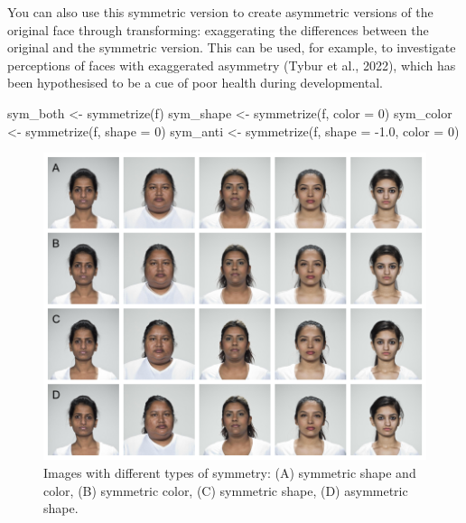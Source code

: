 \documentclass[
  doc,floatsintext]{apa6}
\newenvironment{Shaded}{\begin{snugshade}}{\end{snugshade}}
\newcommand{\AttributeTok}[1]{\textcolor[rgb]{0.77,0.63,0.00}{#1}}
\newcommand{\DecValTok}[1]{\textcolor[rgb]{0.00,0.00,0.81}{#1}}
\newcommand{\FloatTok}[1]{\textcolor[rgb]{0.00,0.00,0.81}{#1}}
\newcommand{\FunctionTok}[1]{\textcolor[rgb]{0.00,0.00,0.00}{#1}}
\newcommand{\NormalTok}[1]{#1}
\newcommand{\OtherTok}[1]{\textcolor[rgb]{0.56,0.35,0.01}{#1}}
\newcommand{\SpecialCharTok}[1]{\textcolor[rgb]{0.00,0.00,0.00}{#1}}
\begin{document}
You can also use this symmetric version to create asymmetric versions of the original face through transforming: exaggerating the differences between the original and the symmetric version. This can be used, for example, to investigate perceptions of faces with exaggerated asymmetry (Tybur et al., 2022), which has been hypothesised to be a cue of poor health during developmental.

\begin{Shaded}
\begin{Highlighting}[]
\NormalTok{sym\_both }\OtherTok{\textless{}{-}} \FunctionTok{symmetrize}\NormalTok{(f)}
\NormalTok{sym\_shape }\OtherTok{\textless{}{-}} \FunctionTok{symmetrize}\NormalTok{(f, }\AttributeTok{color =} \DecValTok{0}\NormalTok{)}
\NormalTok{sym\_color }\OtherTok{\textless{}{-}} \FunctionTok{symmetrize}\NormalTok{(f, }\AttributeTok{shape =} \DecValTok{0}\NormalTok{)}
\NormalTok{sym\_anti }\OtherTok{\textless{}{-}} \FunctionTok{symmetrize}\NormalTok{(f, }\AttributeTok{shape =} \SpecialCharTok{{-}}\FloatTok{1.0}\NormalTok{, }\AttributeTok{color =} \DecValTok{0}\NormalTok{)}
\end{Highlighting}
\end{Shaded}

\begin{figure}
\includegraphics[width=1\linewidth]{index_files/figure-latex/morph-sym-1} \caption{Images with different types of symmetry: (A) symmetric shape and color, (B) symmetric color, (C) symmetric shape, (D) asymmetric shape.}\label{fig:morph-sym}
\end{figure}
\end{document}
